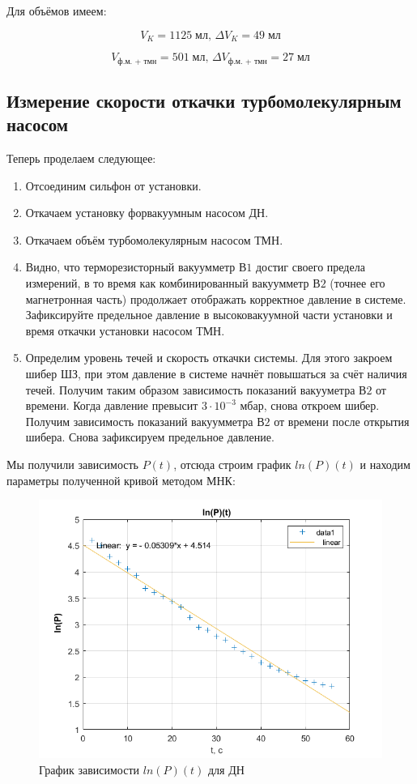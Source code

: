 \documentclass[a4paper, 12pt]{article} %
\begin{document}
Для объёмов имеем:

\begin{equation}
	V_{K} = 1125 \; \text{мл, }	\Delta V_{K} = 49 \; \text{мл}
\end{equation}

\begin{equation}
	V_{\text{ф.м. + тмн}} = 501 \; \text{мл, }	\Delta V_{\text{ф.м. + тмн}} = 27 \; \text{мл}
\end{equation}

\subsection{Измерение скорости откачки турбомолекулярным насосом}

Теперь проделаем следующее:

\begin{enumerate}
	\item Отсоединим сильфон от установки.
	\item Откачаем установку форвакуумным насосом ДН.
	\item Откачаем объём турбомолекулярным насосом ТМН.
	\item Видно, что терморезисторный вакуумметр $В1$ достиг своего предела измерений, в то время как комбинированный вакуумметр $В2$ (точнее его магнетронная часть) продолжает отображать корректное давление в системе. Зафиксируйте предельное давление в высоковакуумной части установки и время откачки установки насосом ТМН.
	\item Определим уровень течей и скорость откачки системы. Для этого закроем шибер ШЗ, при этом давление в системе начнёт повышаться за счёт наличия течей. Получим таким образом зависимость показаний вакууметра $В2$ от времени. Когда давление превысит $3 \cdot 10^{-3}$ мбар,
снова откроем шибер. Получим зависимость показаний вакуумметра $В2$ от времени после открытия шибера. Снова зафиксируем предельное давление.
\end{enumerate}

Мы получили зависимость $P(t)$, отсюда строим график $ln(P)(t)$ и находим параметры полученной кривой методом МНК:

\begin{figure}[h]
    \centering
    \includegraphics[width = 11 cm]{fig1}
    \caption{График зависимости $ln(P)(t)$ для ДН}
    \label{fig:vac}
\end{figure}
\end{document}

